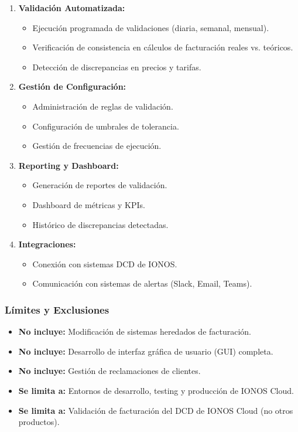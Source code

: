 \begin{enumerate}
    \item \textbf{Validación Automatizada:}
          \begin{itemize}
              \item Ejecución programada de validaciones (diaria, semanal, mensual).
              \item Verificación de consistencia en cálculos de facturación reales vs. teóricos.
              \item Detección de discrepancias en precios y tarifas.
          \end{itemize}

    \item \textbf{Gestión de Configuración:}
          \begin{itemize}
              \item Administración de reglas de validación.
              \item Configuración de umbrales de tolerancia.
              \item Gestión de frecuencias de ejecución.
          \end{itemize}

    \item \textbf{Reporting y Dashboard:}
          \begin{itemize}
              \item Generación de reportes de validación.
              \item Dashboard de métricas y KPIs.
              \item Histórico de discrepancias detectadas.
          \end{itemize}

    \item \textbf{Integraciones:}
          \begin{itemize}
              \item Conexión con sistemas DCD de IONOS.
              \item Comunicación con sistemas de alertas (Slack, Email, Teams).
          \end{itemize}
\end{enumerate}

\subsubsection{Límites y Exclusiones}

\begin{itemize}
    \item \textbf{No incluye:} Modificación de sistemas heredados de facturación.
    \item \textbf{No incluye:} Desarrollo de interfaz gráfica de usuario (GUI) completa.
    \item \textbf{No incluye:} Gestión de reclamaciones de clientes.
    \item \textbf{Se limita a:} Entornos de desarrollo, testing y producción de IONOS Cloud.
    \item \textbf{Se limita a:} Validación de facturación del DCD de IONOS Cloud (no otros productos).
\end{itemize}



